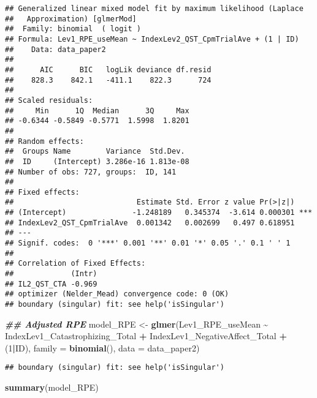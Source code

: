 \documentclass[
  12pt,
]{article}
\newenvironment{Shaded}{\begin{snugshade}}{\end{snugshade}}
\newcommand{\AttributeTok}[1]{\textcolor[rgb]{0.13,0.29,0.53}{#1}}
\newcommand{\DecValTok}[1]{\textcolor[rgb]{0.00,0.00,0.81}{#1}}
\newcommand{\DocumentationTok}[1]{\textcolor[rgb]{0.56,0.35,0.01}{\textbf{\textit{#1}}}}
\newcommand{\FunctionTok}[1]{\textcolor[rgb]{0.13,0.29,0.53}{\textbf{#1}}}
\newcommand{\NormalTok}[1]{#1}
\newcommand{\OtherTok}[1]{\textcolor[rgb]{0.56,0.35,0.01}{#1}}
\newcommand{\SpecialCharTok}[1]{\textcolor[rgb]{0.81,0.36,0.00}{\textbf{#1}}}
\begin{document}
\begin{verbatim}
## Generalized linear mixed model fit by maximum likelihood (Laplace
##   Approximation) [glmerMod]
##  Family: binomial  ( logit )
## Formula: Lev1_RPE_useMean ~ IndexLev2_QST_CpmTrialAve + (1 | ID)
##    Data: data_paper2
## 
##      AIC      BIC   logLik deviance df.resid 
##    828.3    842.1   -411.1    822.3      724 
## 
## Scaled residuals: 
##     Min      1Q  Median      3Q     Max 
## -0.6344 -0.5849 -0.5771  1.5998  1.8201 
## 
## Random effects:
##  Groups Name        Variance  Std.Dev. 
##  ID     (Intercept) 3.286e-16 1.813e-08
## Number of obs: 727, groups:  ID, 141
## 
## Fixed effects:
##                            Estimate Std. Error z value Pr(>|z|)    
## (Intercept)               -1.248189   0.345374  -3.614 0.000301 ***
## IndexLev2_QST_CpmTrialAve  0.001342   0.002699   0.497 0.618951    
## ---
## Signif. codes:  0 '***' 0.001 '**' 0.01 '*' 0.05 '.' 0.1 ' ' 1
## 
## Correlation of Fixed Effects:
##             (Intr)
## IL2_QST_CTA -0.969
## optimizer (Nelder_Mead) convergence code: 0 (OK)
## boundary (singular) fit: see help('isSingular')
\end{verbatim}

\begin{Shaded}
\begin{Highlighting}[]
\DocumentationTok{\#\# Adjusted RPE}
\NormalTok{model\_RPE }\OtherTok{\textless{}{-}} \FunctionTok{glmer}\NormalTok{(Lev1\_RPE\_useMean }\SpecialCharTok{\textasciitilde{}}\NormalTok{  IndexLev1\_Catastrophizing\_Total }\SpecialCharTok{+}\NormalTok{ IndexLev1\_NegativeAffect\_Total }\SpecialCharTok{+}\NormalTok{ (}\DecValTok{1}\SpecialCharTok{|}\NormalTok{ID), }\AttributeTok{family =} \FunctionTok{binomial}\NormalTok{(), }\AttributeTok{data =}\NormalTok{ data\_paper2)}
\end{Highlighting}
\end{Shaded}

\begin{verbatim}
## boundary (singular) fit: see help('isSingular')
\end{verbatim}

\begin{Shaded}
\begin{Highlighting}[]
\FunctionTok{summary}\NormalTok{(model\_RPE)}
\end{Highlighting}
\end{Shaded}
\end{document}
